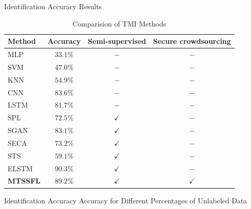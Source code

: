 \documentclass[UTF8]{beamer}
\begin{document}
\begin{frame}
{Identification Accuracy}
{Results}
\begin{table}
\caption{Comparision of TMI Methods}
\begin{tabular}{lccc}
\hline Method & Accuracy & Semi-supervised & Secure crowdsourcing \\
\hline MLP & $33.1 \%$ & $-$ & $-$ \\
SVM & $47.0 \%$ & $-$ & $-$ \\
KNN & $54.9 \%$ & $-$ & $-$ \\
CNN & $83.6 \%$ & $-$ & $-$ \\
LSTM & $81.7 \%$ & $-$ & $-$ \\
SPL & $72.5 \%$ & $\checkmark$ & $-$ \\
SGAN & $83.1 \%$ & $\checkmark$ & $-$ \\
SECA & $73.2 \%$ & $\checkmark$ & $-$ \\
STS & $59.1 \%$ & $\checkmark$ & $-$ \\
ELSTM & $90.3 \%$ & $\checkmark$ & $-$ \\
\bf{MTSSFL} & $89.2 \%$ & $\checkmark$ & $\checkmark$ \\
\hline
\end{tabular}
\end{table}

\end{frame}

\begin{frame}
{Identification Accuracy}
{Accuracy for Different Percentages of Unlabeled Data}

\begin{table}
\caption{Sensitivity of TMI Accuracy to Percentage of Unlabeled Data}
\end{table}
\end{frame}
\end{document}
